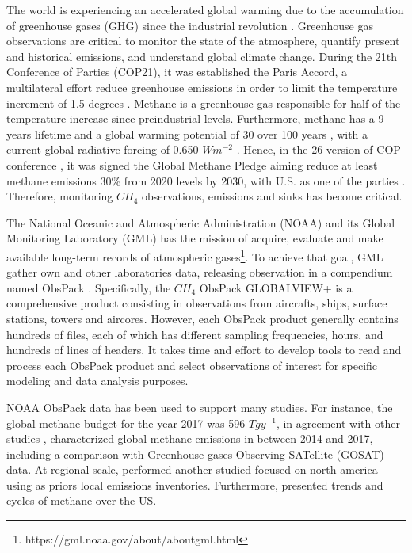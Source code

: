 \documentclass[preprint, 3p,
authoryear]{elsarticle} %
\begin{document}
The world is experiencing an accelerated global warming due to the
accumulation of greenhouse gases (GHG) since the industrial revolution
\citep{us2018}. Greenhouse gas observations are critical to monitor the
state of the atmosphere, quantify present and historical emissions, and
understand global climate change. During the 21th Conference of Parties
(COP21), it was established the Paris Accord, a multilateral effort
reduce greenhouse emissions in order to limit the temperature increment
of 1.5 degrees \citep{rhodes20162015}. Methane is a greenhouse gas
responsible for half of the temperature increase since preindustrial
levels. Furthermore, methane has a 9 years lifetime and a global warming
potential of 30 over 100 years \citep{epagwp}, with a current global
radiative forcing of 0.650 \(Wm^{-2}\) \citep{aggi}. Hence, in the 26
version of COP conference \citep{hunter2021glasgow}, it was signed the
Global Methane Pledge aiming reduce at least methane emissions 30\% from
2020 levels by 2030, with U.S. as one of the parties \citep{wh}.
Therefore, monitoring \(CH_4\) observations, emissions and sinks has
become critical.

The National Oceanic and Atmospheric Administration (NOAA) and its
Global Monitoring Laboratory (GML) has the mission of acquire, evaluate
and make available long-term records of atmospheric gases\footnote{https://gml.noaa.gov/about/aboutgml.html}.
To achieve that goal, GML gather own and other laboratories data,
releasing observation in a compendium named ObsPack
\citep{masarie2014obspack}. Specifically, the \(CH_4\) ObsPack
GLOBALVIEW+ is a comprehensive product consisting in observations from
aircrafts, ships, surface stations, towers and aircores. However, each
ObsPack product generally contains hundreds of files, each of which has
different sampling frequencies, hours, and hundreds of lines of headers.
It takes time and effort to develop tools to read and process each
ObsPack product and select observations of interest for specific
modeling and data analysis purposes.

NOAA ObsPack data has been used to support many studies. For instance,
the global methane budget for the year 2017 was 596 \(Tgy^{-1}\), in
agreement with other studies
\citep{saunois2020global, saunois2016global} \citet{lu2021global},
characterized global methane emissions in between 2014 and 2017,
including a comparison with Greenhouse gases Observing SATellite (GOSAT)
data. \citet{saunois2016global} At regional scale, \citet{lu2022methane}
performed another studied focused on north america using as priors local
emissions inventories. Furthermore, \citet{hu2023trend} presented trends
and cycles of methane over the US.
\end{document}
